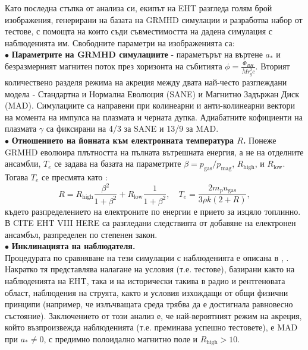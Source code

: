 Като последна стъпка от анализа си, екипът на EHT разгледа голям брой изображения, генерирани на базата на GRMHD симулации и разработва набор от тестове, с помощта на които съди съвместимостта на дадена симулация с наблюденията им. Свободните параметри на изображенията са:\\\newline
$\bullet$ \textbf{Параметрите на GRMHD симулациите} - параметърът на въртене $a_*$ и безразмерният магнитен поток през хоризонта на събитията $\phi = \frac{\Phi_{BH}}{\dot{M}r_g^2c}$. Вторият количествено разделя режима на акреция между двата най-често разглеждани модела - Стандартна и Нормална Еволюция (SANE) и Магнитно Задържан Диск (MAD). Симулациите са направени при колинеарни и анти-колинеарни вектори на момента на импулса на плазмата и черната дупка. Адиабатните кофициенти на плазмата $\gamma$ са фиксирани на 4/3 за SANE и 13/9 за MAD.\\\newline
$\bullet$ \textbf{Отношението на йонната към електронната температура $R$.} Понеже GRMHD еволюира плътността на пълната вътрешната енергия, а не на отделните ансамбли, $T_e$ се задава на базата на параметрите $\beta = p_{\text{gas}} / p_\text{mag}$, $R_\text{high}$, и $R_\text{low}$. Тогава $T_e$ се пресмята като \cite{EHT_M87_VIII}:
\begin{equation}
	R = R_\text{high}\frac{\beta^2}{1 + \beta^2} + R_\text{low}\frac{1}{1 + \beta^2},\quad T_e = \frac{2m_pu_\text{gas}}{3\rho k (2 + R)},
\end{equation}   
където разпределението на електроните по енергии е прието за изцяло топлинно. В CITE EHT VIII HERE са разгледани следствията от добавяне на електронен ансамбъл, разпределен по степенен закон.\\\newline
$\bullet$ \textbf{Инклинацията на наблюдателя.}\\

Процедурата по сравняване на тези симулации с наблюденията е описана в \cite{EHT_M87_V}, \cite{EHT_M87_VIII}. Накратко тя представлява налагане на условия (т.е. тестове), базирани както на наблюденията на EHT, така и на исторически такива в радио и рентгеновата област, наблюдения на струята, както и условия изхождащи от общи физични принципи (например, че излъчващата среда трябва да е достигнала равновесно състояние). Заключението от този анализ е, че най-вероятният режим на акреция, който възпроизвежда наблюденията (т.е. преминава успешно тестовете), е MAD при $a_*\ne 0$, с предимно полоидално магнитно поле и $R_\text{high} > 10$. 


